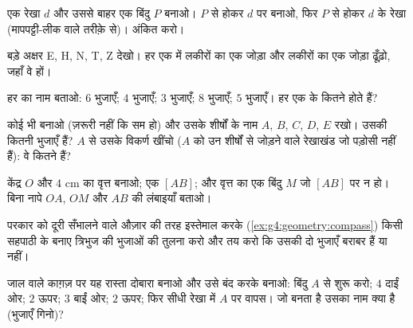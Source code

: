 \begin{exercise}[$\star$]\label{exo:g4:geometry:1}
एक रेखा $d$ और उससे बाहर एक बिंदु $P$ बनाओ। $P$ से होकर $d$ पर
 बनाओ, फिर $P$ से होकर $d$ के  रेखा (मापपट्टी-लीक वाले
तरीक़े से)।  अंकित करो।
\end{exercise}

\begin{exercise}[$\star$]\label{exo:g4:geometry:2}
बड़े अक्षर E, H, N, T, Z देखो। हर एक में  लकीरों का एक
जोड़ा और  लकीरों का एक जोड़ा ढूँढ़ो, जहाँ वे हों।
\end{exercise}

\begin{exercise}[$\star$]\label{exo:g4:geometry:3}
हर  का नाम बताओ: $6$ भुजाएँ; $4$ भुजाएँ; $3$ भुजाएँ;
$8$ भुजाएँ; $5$ भुजाएँ। हर एक के कितने \emph{} होते हैं?
\end{exercise}

\begin{exercise}[$\star$]\label{exo:g4:geometry:4}
कोई भी  बनाओ (ज़रूरी नहीं कि सम हो) और उसके शीर्षों के नाम
$A$, $B$, $C$, $D$, $E$ रखो। उसकी कितनी भुजाएँ हैं? $A$ से उसके
विकर्ण खींचो ($A$ को उन शीर्षों से जोड़ने वाले रेखाखंड जो पड़ोसी
नहीं हैं): वे कितने हैं?
\end{exercise}

\begin{exercise}[$\star$]\label{exo:g4:geometry:5}
केंद्र $O$ और  $4$ cm का वृत्त बनाओ; एक  $[AB]$;
और वृत्त का एक बिंदु $M$ जो $[AB]$ पर न हो। बिना नापे $OA$,
$OM$ और $AB$ की लंबाइयाँ बताओ।
\end{exercise}

\begin{exercise}[$\star$]\label{exo:g4:geometry:6}
परकार को दूरी सँभालने वाले औज़ार की तरह इस्तेमाल करके
(\cref{ex:g4:geometry:compass}) किसी सहपाठी के बनाए त्रिभुज की
भुजाओं की तुलना करो और तय करो कि उसकी दो भुजाएँ बराबर हैं या नहीं।
\end{exercise}

\begin{exercise}[$\star$]\label{exo:g4:geometry:7}
जाल वाले काग़ज़ पर यह रास्ता दोबारा बनाओ और उसे बंद करके 
बनाओ: बिंदु $A$ से शुरू करो; $4$ दाईं ओर; $2$ ऊपर; $3$ बाईं ओर;
$2$ ऊपर; फिर सीधी रेखा में $A$ पर वापस। जो  बनता है उसका
नाम क्या है (भुजाएँ गिनो)?
\end{exercise}

